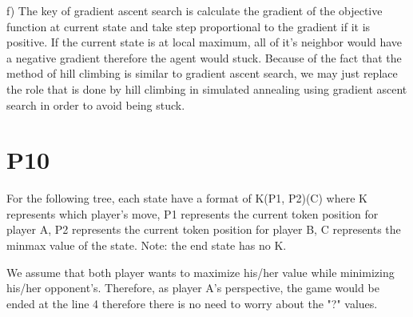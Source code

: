 \documentclass{article}
\begin{document}
f) The key of gradient ascent search is calculate the gradient of the objective function at current state and take step proportional to the gradient if it is positive. If the current state is at local maximum, all of it's neighbor would have a negative gradient therefore the agent would stuck. Because of the fact that the method of hill climbing is similar to gradient ascent search, we may just replace the role that is done by hill climbing in simulated annealing using gradient ascent search in order to avoid being stuck.

\section*{P10}

For the following tree, each state have a format of K(P1, P2)(C) where K represents which player's move, P1 represents the current token position for player A, P2 represents the current token position for player B, C represents the minmax value of the state. Note: the end state has no K.


\vspace{5mm}
\hspace{5mm}
We assume that both player wants to maximize his/her value while minimizing his/her opponent's. Therefore, as player A's perspective, the game would be ended at the line 4 therefore there is no need to worry about the "?" values.
\end{document}
